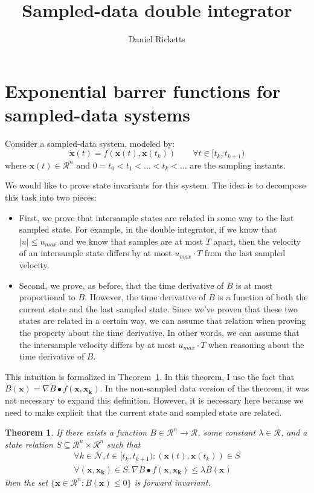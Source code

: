\documentclass[12pt]{article}
\title{Sampled-data double integrator}
\author{Daniel Ricketts}
\newtheorem{theorem}{Theorem}
\newcommand{\vecbold}[1]{\boldsymbol{#1}}
\newcommand{\state}{\mathcal{R}^n}
\begin{document}
\maketitle

\section{Exponential barrer functions for sampled-data systems}
Consider a sampled-data system, modeled by:
\[\dot{\vecbold{x}}(t) = f(\vecbold{x}(t),\vecbold{x}(t_k))\qquad\forall t \in [t_k, t_{k+1})\]
where $\vecbold{x}(t) \in \state$ and $0 = t_0 < t_1 < \ldots < t_k < \ldots$ are the sampling instants.

We would like to prove state invariants for this system. The idea is to
decompose this task into two pieces:
\begin{itemize}
\item First, we prove that intersample states are related in some way to
  the last sampled state. For example, in the double integrator, if we know
  that $|u| \leq u_{max}$ and we know that samples are at most $T$ apart,
  then the velocity of an intersample state differs by at most $u_{max}\cdot T$
  from the last sampled velocity.
\item Second, we prove, as before, that the time derivative of $B$ is at
  most proportional to $B$. However, the time derivative of $B$ is a
  function of both the current state and the last sampled state. Since
  we've proven that these two states are related in a certain way, we can
  assume that relation when proving the property about the time
  derivative. In other words, we can assume that the intersample velocity
  differs by at most $u_{max}\cdot T$ when reasoning about the time
  derivative of $B$.
\end{itemize}

This intuition is formalized in Theorem~\ref{thm:exp-barrier-sampled}. In
this theorem, I use the fact that $\dot{B}(\vecbold{x}) = \nabla B \bullet
f(\vecbold{x},\vecbold{x_k})$. In the non-sampled data version of the
theorem, it was not necessary to expand this definition. However, it is
necessary here because we need to make explicit that the current state and
sampled state are related.

\begin{theorem}
If there exists a function $B \in \state \rightarrow \mathcal{R}$, some constant $\lambda \in \mathcal{R}$, and a state relation $S \subseteq \state \times \state$ such that
\begin{align}
\forall k \in \mathcal{N}, t \in [t_k, t_{k+1}) : (\vecbold{x}(t),\vecbold{x}(t_k)) \in S \\
\forall (\vecbold{x}, \vecbold{x_k}) \in S : \nabla B \bullet f(\vecbold{x},\vecbold{x_k}) \leq \lambda B(\vecbold{x})
\end{align}
then the set $\{\vecbold{x} \in \mathcal{R}^n : B(\vecbold{x}) \leq 0\}$ is forward invariant.
\label{thm:exp-barrier-sampled}
\end{theorem}
\end{document}
